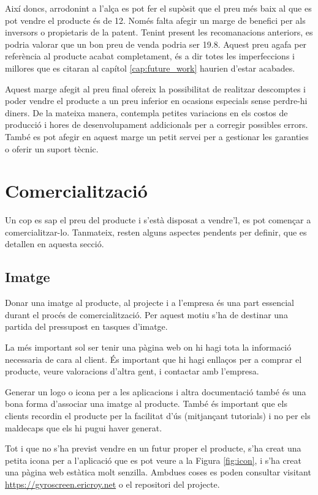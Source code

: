 Així doncs, arrodonint a l'alça es pot fer el supòsit que el preu més baix al
que es pot vendre el producte és de
\SI[round-mode=places,round-precision=0]{12}{\EUR}. Només falta afegir un marge
de benefici per als inversors o propietaris de la patent.
Tenint present les recomanacions anteriors, es podria valorar que
un bon preu de venda podria ser
\SI{19.8}{\EUR}. Aquest preu agafa per referència al
producte acabat completament, és a dir totes les imperfeccions i millores que
es citaran al capítol \ref{cap:future_work} haurien d'estar acabades.

Aquest marge afegit al preu final ofereix la possibilitat de realitzar
descomptes i poder vendre el producte a un preu inferior en ocasions especials
sense perdre-hi diners. De la mateixa manera, contempla petites variacions en
els costos de producció i hores de desenvolupament addicionals per a corregir
possibles errors. També es pot afegir en aquest marge un petit servei per a
gestionar les garanties o oferir un suport tècnic.

\section{Comercialització}

Un cop es sap el preu del producte i s'està disposat a vendre'l, es pot
començar a comercialitzar-lo. Tanmateix, resten alguns aspectes pendents per
definir, que es detallen en aquesta secció.

\subsection{Imatge}

Donar una imatge al producte, al projecte i a l'empresa és una part essencial
durant el procés de comercialització. Per aquest motiu s'ha de destinar una
partida del pressupost en tasques d'imatge.

La més important sol ser tenir una pàgina web on hi hagi tota la informació
necessaria de cara al client. És important que hi hagi enllaços per a comprar el
producte, veure valoracions d'altra gent, i contactar amb l'empresa.

Generar un logo o icona per a les aplicacions i altra documentació també és una
bona forma d'associar una imatge al producte. També és important que els clients
recordin el producte per la facilitat d'ús (mitjançant tutorials) i no per
els maldecaps que els hi pugui haver generat.

Tot i que no s'ha previst vendre en un futur proper el producte, s'ha creat una
petita icona per a l'aplicació que es pot veure a la Figura \ref{fig:icon},
i s'ha creat una pàgina web estàtica molt
senzilla. Ambdues coses es poden consultar visitant
\url{https://gyroscreen.ericroy.net} o el repositori del projecte.

